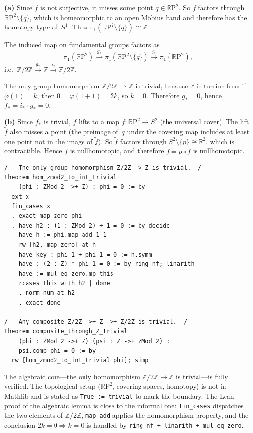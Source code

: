 \documentclass[12pt,oneside]{book}
\theoremstyle{plain}
\theoremstyle{definition}
\theoremstyle{remark}
\newcommand{\RP}{\mathbb{R}\mathrm{P}}
\begin{document}
\begin{proofbox}
\textbf{(a)} Since $f$ is not surjective, it misses some point $q \in \RP^2$.
So $f$ factors through $\RP^2 \setminus \{q\}$, which is homeomorphic to an
open M\"obius band and therefore has the homotopy type of~$S^1$. Thus
$\pi_1(\RP^2 \setminus \{q\}) \cong \mathbb{Z}$.

The induced map on fundamental groups factors as
\[
  \pi_1(\RP^2) \xrightarrow{g_*} \pi_1(\RP^2 \setminus \{q\})
  \xrightarrow{i_*} \pi_1(\RP^2),
\]
i.e.\ $\mathbb{Z}/2\mathbb{Z} \xrightarrow{g_*} \mathbb{Z}
\xrightarrow{i_*} \mathbb{Z}/2\mathbb{Z}$.

The only group homomorphism $\mathbb{Z}/2\mathbb{Z} \to \mathbb{Z}$
is trivial, because $\mathbb{Z}$ is torsion-free: if $\varphi(1) = k$,
then $0 = \varphi(1+1) = 2k$, so $k = 0$. Therefore $g_* = 0$, hence
$f_* = i_* \circ g_* = 0$.

\medskip
\textbf{(b)} Since $f_*$ is trivial, $f$ lifts to a map
$\tilde{f} : \RP^2 \to S^2$ (the universal cover). The lift
$\tilde{f}$ also misses a point (the preimage of~$q$ under the
covering map includes at least one point not in the image of
$\tilde{f}$). So $\tilde{f}$ factors through $S^2 \setminus \{p\}
\cong \mathbb{R}^2$, which is contractible. Hence $\tilde{f}$ is
nullhomotopic, and therefore $f = p \circ \tilde{f}$ is nullhomotopic.
\end{proofbox}

\begin{leanbox}
\begin{Verbatim}[fontsize=\small]
/-- The only group homomorphism Z/2Z -> Z is trivial. -/
theorem hom_zmod2_to_int_trivial
    (phi : ZMod 2 ->+ Z) : phi = 0 := by
  ext x
  fin_cases x
  . exact map_zero phi
  . have h2 : (1 : ZMod 2) + 1 = 0 := by decide
    have h := phi.map_add 1 1
    rw [h2, map_zero] at h
    have key : phi 1 + phi 1 = 0 := h.symm
    have : (2 : Z) * phi 1 = 0 := by ring_nf; linarith
    have := mul_eq_zero.mp this
    rcases this with h2 | done
    . norm_num at h2
    . exact done

/-- Any composite Z/2Z ->+ Z ->+ Z/2Z is trivial. -/
theorem composite_through_Z_trivial
    (phi : ZMod 2 ->+ Z) (psi : Z ->+ ZMod 2) :
    psi.comp phi = 0 := by
  rw [hom_zmod2_to_int_trivial phi]; simp
\end{Verbatim}
\end{leanbox}

\begin{notebox}
The algebraic core---the only homomorphism
$\mathbb{Z}/2\mathbb{Z} \to \mathbb{Z}$ is trivial---is fully verified.
The topological setup ($\RP^2$, covering spaces, homotopy) is not in
Mathlib and is stated as \texttt{True := trivial} to mark the boundary.
The Lean proof of the algebraic lemma is close to the informal one:
\texttt{fin\_cases} dispatches the two elements of $\mathbb{Z}/2\mathbb{Z}$,
\texttt{map\_add} applies the homomorphism property, and the conclusion
$2k = 0 \Rightarrow k = 0$ is handled by \texttt{ring\_nf + linarith + mul\_eq\_zero}.
\end{notebox}
\end{document}
